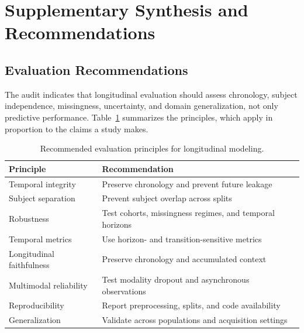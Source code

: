 \documentclass[11pt]{article}
\theoremstyle{plain}
\theoremstyle{definition}
\theoremstyle{remark}
\begin{document}
\section{Supplementary Synthesis and Recommendations}
\label{sec:appendix_synthesis}

\subsection{Evaluation Recommendations}
\label{sec:appendix_evaluation_recommendations}
The audit indicates that longitudinal evaluation should assess chronology, subject independence, missingness, uncertainty, and domain generalization, not only predictive performance. Table~\ref{tab:benchmark_recommendations} summarizes the principles, which apply in proportion to the claims a study makes.

\begin{table}[!t]
\centering
\small
\setlength{\tabcolsep}{2.8pt}
\renewcommand{\arraystretch}{0.92}
\begin{tabular}{p{2.0cm}p{4.8cm}}
\toprule
\rowcolor{gray!18}
\textbf{Principle} & \textbf{Recommendation} \\
\midrule
Temporal integrity & Preserve chronology and prevent future leakage~\cite{rajkomar2018scalable} \\
Subject separation & Prevent subject overlap across splits~\cite{piryani2025itshightimesurvey} \\
Robustness & Test cohorts, missingness regimes, and temporal horizons~\cite{10483639,9623284} \\
Temporal metrics & Use horizon- and transition-sensitive metrics~\cite{9338417,lazaridou2021mindgapassessingtemporal} \\
Longitudinal faithfulness & Preserve chronology and accumulated context~\cite{wu-etal-2025-unfolding,qiu-etal-2024-large} \\
Multimodal reliability & Test modality dropout and asynchronous observations~\cite{10385940,10890535} \\
Reproducibility & Report preprocessing, splits, and code availability~\cite{rajkomar2018scalable,piryani2025itshightimesurvey} \\
Generalization & Validate across populations and acquisition settings~\cite{10483639,9629798} \\
\bottomrule
\end{tabular}
\caption{Recommended evaluation principles for longitudinal modeling.}
\label{tab:benchmark_recommendations}
\end{table}
\end{document}
